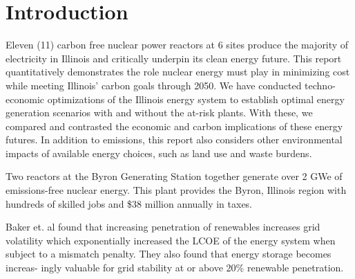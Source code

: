 \section{Introduction}
Eleven (11) carbon free nuclear power reactors at 6 sites produce the majority of
electricity in Illinois and critically underpin its clean energy future. This
report quantitatively demonstrates the role nuclear energy must play in
minimizing cost while meeting Illinois’ carbon goals
through 2050. We have conducted techno-economic optimizations of
the Illinois energy system to establish optimal energy generation scenarios with and without the
at-risk plants. With these, we compared and contrasted the economic and carbon implications of
these energy futures. In addition to emissions, this report also considers
other environmental impacts of available energy choices, such as land use and
waste burdens.

Two reactors at the Byron Generating Station together generate over 2 GWe of
emissions-free nuclear energy. This plant provides the Byron, Illinois region
with hundreds of skilled jobs and \$38 million annually in taxes.

Baker et. al found that increasing penetration of renewables increases grid 
volatility which exponentially increased the \gls{LCOE} of the energy system when 
subject to a mismatch penalty. They also found that energy storage becomes 
increas- ingly valuable for grid stability at or above 20\% renewable 
penetration.

